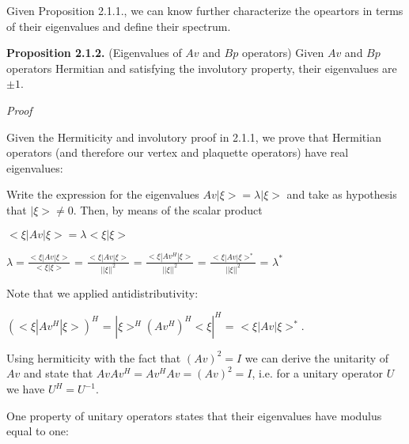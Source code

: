 \documentclass[12pt]{report}
\begin{document}
	
	\begin{minipage}{1\textwidth}
		
		
		Given Proposition 2.1.1., we can know further characterize the opeartors in terms of their eigenvalues and define their spectrum.	\newline
		
		\textbf{Proposition 2.1.2.} (Eigenvalues of $Av$ and $Bp$ operators) Given $Av$ and $Bp$ operators Hermitian and satisfying the involutory property, their eigenvalues are $\pm 1$.
		\newline
		
		\textit{Proof}\newline
		
		Given the Hermiticity and involutory proof in 2.1.1, we prove that Hermitian operators (and therefore our vertex and plaquette operators) have real eigenvalues: \newline
		
		Write the expression for the eigenvalues $Av |\xi> = \lambda |\xi>$ and take as hypothesis that $|\xi> \neq 0$. Then, by means of the scalar product\newline
		
		\begin{center}
			$<\xi|Av|\xi> = \lambda <\xi |\xi>$\newline
			
			$\lambda = \frac {<\xi|Av|\xi>}{<\xi |\xi>}$ = $\frac {<\xi|Av|\xi>}{||\xi||^2}$ = $\frac {<\xi|Av^H|\xi>}{||\xi||^2}$ = $\frac {<\xi|Av|\xi>^*}{||\xi||^2}$ = $\lambda^*$\newline
		\end{center}
		
		Note that we applied antidistributivity: \newline
		
		\begin{center}
			$(<\xi|Av^H|\xi>)^H$ = $|\xi>^H (Av^H)^H <\xi|^H$ = $<\xi|Av|\xi>^*$. \newline
		\end{center}
		
		Using hermiticity with the fact that $(Av)^2=I$ we can derive the unitarity of $Av$ and state that $Av Av^H = Av^H Av = (Av)^2 = I$, i.e. for a unitary operator $U$ we have $U^H=U^{-1}$. \newline
		
		One property of unitary operators states that their eigenvalues have modulus equal to one:\newline 
		

\end{minipage}
\end{document}
